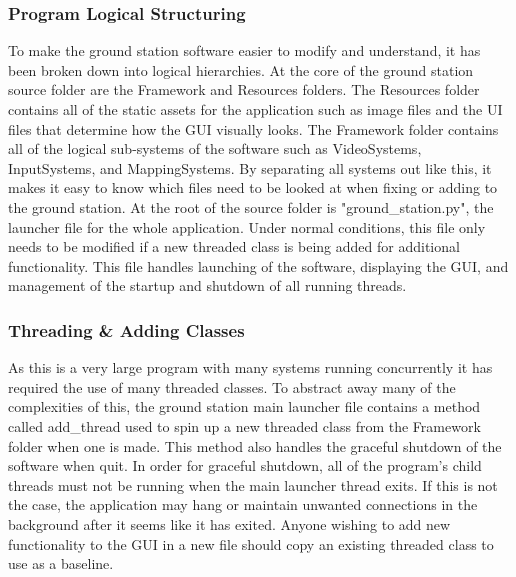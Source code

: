 \subsubsection{Program Logical Structuring}
To make the ground station software easier to modify and understand, it has been broken down into logical hierarchies. At the core of the ground station source folder are the Framework and Resources folders. The Resources folder contains all of the static assets for the application such as image files and the UI files that determine how the GUI visually looks. The Framework folder contains all of the logical sub-systems of the software such as VideoSystems, InputSystems, and MappingSystems. By separating all systems out like this, it makes it easy to know which files need to be looked at when fixing or adding to the ground station. At the root of the source folder is "ground\_station.py", the launcher file for the whole application. Under normal conditions, this file only needs to be modified if a new threaded class is being added for additional functionality. This file handles launching of the software, displaying the GUI, and management of the startup and shutdown of all running threads.

\subsubsection{Threading \& Adding Classes}
As this is a very large program with many systems running concurrently it has required the use of many threaded classes. To abstract away many of the complexities of this, the ground station main launcher file contains a method called add\_thread used to spin up a new threaded class from the Framework folder when one is made. This method also handles the graceful shutdown of the software when quit. In order for graceful shutdown, all of the program's child threads must not be running when the main launcher thread exits. If this is not the case, the application may hang or maintain unwanted connections in the background after it seems like it has exited. Anyone wishing to add new functionality to the GUI in a new file should copy an existing threaded class to use as a baseline.

